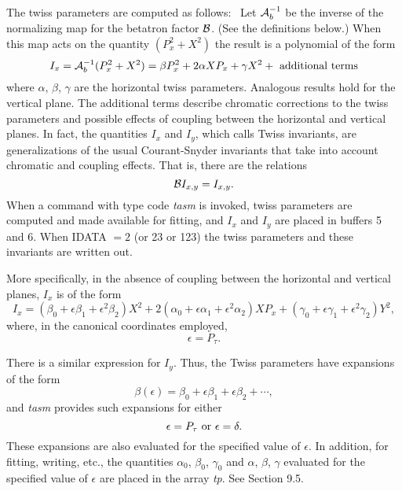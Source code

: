 The twiss parameters are computed as follows: \ Let ${\cal A}^{-1}_b$ be the inverse of the normalizing map for the betatron factor ${\cal B}$.  (See the definitions below.)  When this map acts on the quantity $(P_x^2 + X^2)$ the result is a polynomial of the form
\begin{equation}
I_x = {\cal A}^{-1}_b (P^2_x + X^2) = \beta P_x^2 + 2\alpha XP_x +\gamma X^2 + \ {\rm additional \ terms}
\end{equation}
where $\alpha$, $\beta$, $\gamma$ are the horizontal twiss parameters.  Analogous results hold for the vertical plane.  The additional terms describe chromatic corrections to the twiss parameters and possible effects of coupling between the horizontal and vertical planes.  In fact, the quantities $I_x$ and $I_y$, which \Mary calls Twiss invariants, are generalizations of the usual Courant-Snyder invariants that take into account chromatic and coupling effects.   That is, there are the relations
\begin{equation}
{\cal B} I_{x,y} = I_{x,y}.
\end{equation}
When a command with type code {\em tasm} is invoked, twiss parameters are computed and made available for fitting, and $I_x$ and $I_y$ are placed in buffers 5 and 6.  When IDATA $= 2$ (or 23 or 123) the twiss parameters and these invariants are written out.

More specifically, in the absence of coupling between the horizontal and vertical planes, $I_x$ is of the form
\begin{equation}
I_x = (\beta_0 + \epsilon \beta_1 + \epsilon^2 \beta_2) X^2 + 2 (\alpha_0 + \epsilon \alpha_1 + \epsilon^2 \alpha_2) XP_x + (\gamma_0 + \epsilon \gamma_1 + \epsilon^2 \gamma_2) Y^2,
\end{equation}
where, in the canonical coordinates employed,
\begin{equation}
\epsilon = P_{\tau}.
\end{equation}

There is a similar expression for $I_y$.  Thus, the Twiss parameters have expansions of the form
\begin{equation}
\beta (\epsilon ) = \beta_0 + \epsilon \beta_1 + \epsilon \beta_2 + \cdots ,
\end{equation}
and {\em tasm} provides such expansions for either
\begin{equation}
\epsilon = P_{\tau} \ {\rm or} \ \epsilon = \delta .
\end{equation}
These expansions are also evaluated for the specified value of $\epsilon$.  In addition, for fitting, writing, etc., the quantities $\alpha_0$, $\beta_0$, $\gamma_0$ and $\alpha$, $\beta$, $\gamma$ evaluated for the specified value of $\epsilon$ are placed in the array {\em tp}.  See Section 9.5.

